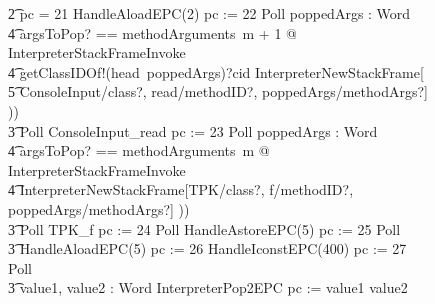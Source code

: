 \begin{figure}[t]
\begin{circus}
    \t2 {} \circelse pc = 21 \circthen HandleAloadEPC(2) \circseq pc := 22 \circseq Poll \circseq \circvar poppedArgs : \seq Word \circspot \\
    \t4 \lschexpract \exists argsToPop?  == methodArguments~m + 1 @ InterpreterStackFrameInvoke \rschexpract \circseq \\
    \t4 getClassIDOf!(head~poppedArgs)?cid \then \lschexpract InterpreterNewStackFrame[\\
    \t5 ConsoleInput/class?, read/methodID?, poppedArgs/methodArgs?] \rschexpract)) \\
    \t3 Poll \circseq ConsoleInput\_read \circseq pc := 23 \circseq Poll \circseq \circvar poppedArgs : \seq Word \circspot \\
    \t4 \lschexpract \exists argsToPop? == methodArguments~m @ InterpreterStackFrameInvoke \rschexpract \circseq \\
    \t4 \lschexpract InterpreterNewStackFrame[TPK/class?, f/methodID?, poppedArgs/methodArgs?] \rschexpract)) \circseq \\
    \t3 Poll \circseq TPK\_f \circseq pc := 24 \circseq Poll \circseq HandleAstoreEPC(5) \circseq pc := 25 \circseq Poll \circseq \\
    \t3 HandleAloadEPC(5) \circseq pc := 26 \circseq HandleIconstEPC(400) \circseq pc := 27 \circseq Poll \circseq \\
    \t3 \circvar value1, value2 : Word \circspot InterpreterPop2EPC \circseq pc := \IF value1 \leq value2   \\

\end{circus}
\end{figure}

